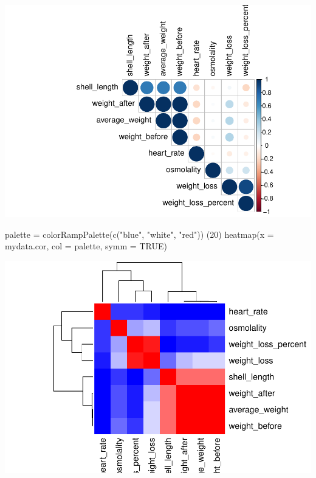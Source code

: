 \documentclass[
]{article}
\newenvironment{Shaded}{\begin{snugshade}}{\end{snugshade}}
\newcommand{\AttributeTok}[1]{\textcolor[rgb]{0.77,0.63,0.00}{#1}}
\newcommand{\ConstantTok}[1]{\textcolor[rgb]{0.00,0.00,0.00}{#1}}
\newcommand{\DecValTok}[1]{\textcolor[rgb]{0.00,0.00,0.81}{#1}}
\newcommand{\FunctionTok}[1]{\textcolor[rgb]{0.00,0.00,0.00}{#1}}
\newcommand{\NormalTok}[1]{#1}
\newcommand{\OtherTok}[1]{\textcolor[rgb]{0.56,0.35,0.01}{#1}}
\newcommand{\StringTok}[1]{\textcolor[rgb]{0.31,0.60,0.02}{#1}}
\begin{document}
\includegraphics{physiology_stats_files/figure-latex/unnamed-chunk-4-1.pdf}

\begin{Shaded}
\begin{Highlighting}[]
\NormalTok{palette }\OtherTok{=} \FunctionTok{colorRampPalette}\NormalTok{(}\FunctionTok{c}\NormalTok{(}\StringTok{"blue"}\NormalTok{, }\StringTok{"white"}\NormalTok{, }\StringTok{"red"}\NormalTok{)) (}\DecValTok{20}\NormalTok{)}
\FunctionTok{heatmap}\NormalTok{(}\AttributeTok{x =}\NormalTok{ mydata.cor, }\AttributeTok{col =}\NormalTok{ palette, }\AttributeTok{symm =} \ConstantTok{TRUE}\NormalTok{)}
\end{Highlighting}
\end{Shaded}

\includegraphics{physiology_stats_files/figure-latex/unnamed-chunk-4-2.pdf}
\end{document}
